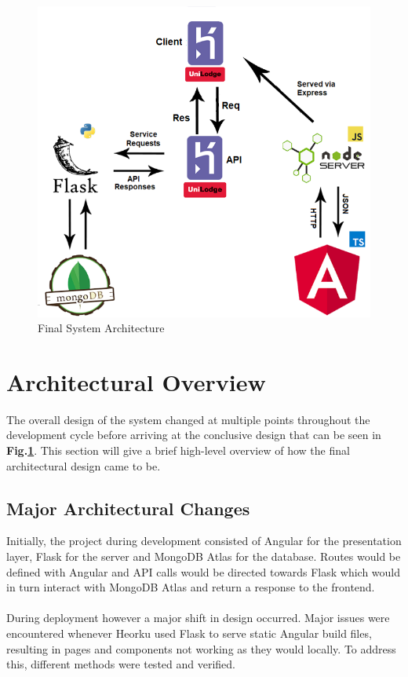 \begin{figure}[H]
	\caption{Final System Architecture\newline}
	\label{image:finaldesign}
	\centering
	\includegraphics[width=1\textwidth]{images/design_final.png}
\end{figure}	

\section{Architectural Overview}
The overall design of the system changed at multiple points throughout the development cycle before arriving at the conclusive design that can be seen in \textbf{Fig.\ref{image:finaldesign}}. This section will give a brief high-level overview of how the final architectural design came to be.

\subsection{Major Architectural Changes}
Initially, the project during development consisted of Angular for the presentation layer, Flask for the server and MongoDB Atlas for the database. Routes would be defined with Angular and API calls would be directed towards Flask which would in turn interact with MongoDB Atlas and return a response to the frontend.

\paragraph{}
During deployment however a major shift in design occurred. Major issues were encountered whenever Heorku used Flask to serve static Angular build files, resulting in pages and components not working as they would locally. To address this, different methods were tested and verified. 


